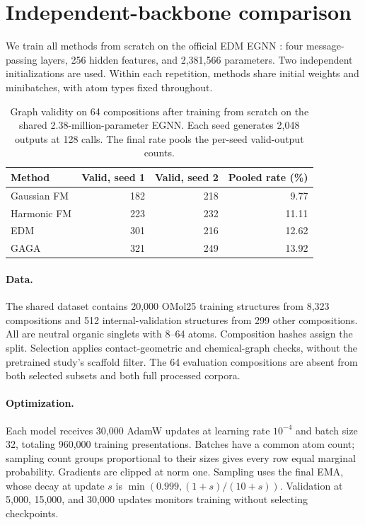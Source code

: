 \section{Independent-backbone comparison}\label{app:matched-generators}
We train all methods from scratch on the official EDM EGNN \citep{edm}: four message-passing layers, 256 hidden features, and 2,381,566 parameters. Two independent initializations are used. Within each repetition, methods share initial weights and minibatches, with atom types fixed throughout.

\begin{table}[t]
\centering
\caption{Graph validity on 64 compositions after training from scratch on the shared 2.38-million-parameter EGNN. Each seed generates 2,048 outputs at 128 calls. The final rate pools the per-seed valid-output counts.}
\begin{tabular}{lrrr}
\toprule
Method & Valid, seed 1 & Valid, seed 2 & Pooled rate (\%)\\
\midrule
Gaussian FM & 182 & 218 & 9.77\\
Harmonic FM & 223 & 232 & 11.11\\
EDM & 301 & 216 & 12.62\\
GAGA & 321 & 249 & 13.92\\
\bottomrule
\end{tabular}\label{tab:matched-generators}
\end{table}

\paragraph{Data.}
The shared dataset contains 20,000 OMol25 training structures from 8,323 compositions and 512 internal-validation structures from 299 other compositions. All are neutral organic singlets with 8--64 atoms. Composition hashes assign the split. Selection applies contact-geometric and chemical-graph checks, without the pretrained study's scaffold filter. The 64 evaluation compositions are absent from both selected subsets and both full processed corpora.

\paragraph{Optimization.}
Each model receives 30,000 AdamW updates at learning rate $10^{-4}$ and batch size 32, totaling 960,000 training presentations. Batches have a common atom count; sampling count groups proportional to their sizes gives every row equal marginal probability. Gradients are clipped at norm one. Sampling uses the final EMA, whose decay at update $s$ is $\min(0.999,(1+s)/(10+s))$. Validation at 5,000, 15,000, and 30,000 updates monitors training without selecting checkpoints.


